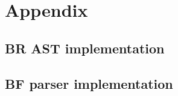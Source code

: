 \documentclass[../main]{subfiles}
\begin{document}
\appendix
\section{Appendix}

\subsection{BR AST implementation} \label{app:bf-ast}



\clearpage{}
\subsection{BF parser implementation} \label{app:bf-parser}


\end{document}
